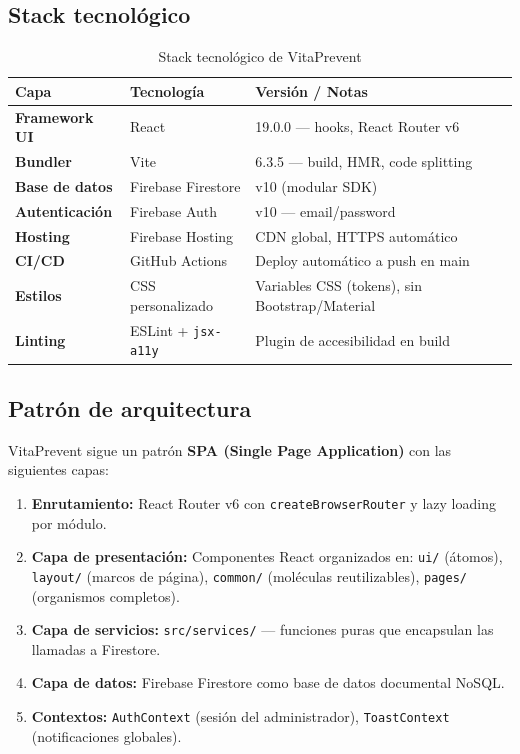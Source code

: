 \documentclass[12pt, a4paper]{article}
\begin{document}
\subsection{Stack tecnológico}

\begin{table}[H]
\centering
\caption{Stack tecnológico de VitaPrevent}
\begin{tabular}{@{}>{\bfseries}p{3.5cm} p{4.5cm} p{5.5cm}@{}}
\toprule
\rowcolor{royalblue!12}
\textbf{Capa} & \textbf{Tecnología} & \textbf{Versión / Notas} \\
\midrule
Framework UI & React & 19.0.0 — hooks, React Router v6 \\
Bundler & Vite & 6.3.5 — build, HMR, code splitting \\
Base de datos & Firebase Firestore & v10 (modular SDK) \\
Autenticación & Firebase Auth & v10 — email/password \\
Hosting & Firebase Hosting & CDN global, HTTPS automático \\
CI/CD & GitHub Actions & Deploy automático a push en main \\
Estilos & CSS personalizado & Variables CSS (tokens), sin Bootstrap/Material \\
Linting & ESLint + \texttt{jsx-a11y} & Plugin de accesibilidad en build \\
\bottomrule
\end{tabular}
\end{table}

\subsection{Patrón de arquitectura}

VitaPrevent sigue un patrón \textbf{SPA (Single Page Application)} con las siguientes capas:

\begin{enumerate}
  \item \textbf{Enrutamiento:} React Router v6 con \texttt{createBrowserRouter} y lazy loading por módulo.
  \item \textbf{Capa de presentación:} Componentes React organizados en: \texttt{ui/} (átomos), \texttt{layout/} (marcos de página), \texttt{common/} (moléculas reutilizables), \texttt{pages/} (organismos completos).
  \item \textbf{Capa de servicios:} \texttt{src/services/} — funciones puras que encapsulan las llamadas a Firestore.
  \item \textbf{Capa de datos:} Firebase Firestore como base de datos documental NoSQL.
  \item \textbf{Contextos:} \texttt{AuthContext} (sesión del administrador), \texttt{ToastContext} (notificaciones globales).
\end{enumerate}
\end{document}
